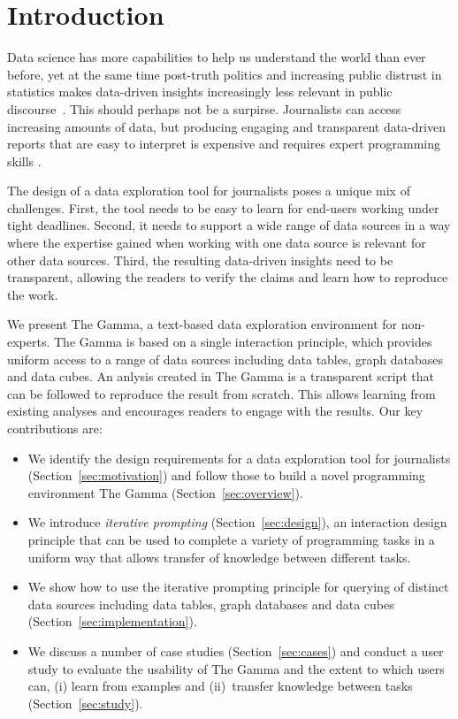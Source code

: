 \documentclass{sigchi}
\begin{document}
\section{Introduction}
Data science has more capabilities to help us understand the world than ever before, yet at the
same time post-truth politics and increasing public distrust in statistics makes data-driven insights
increasingly less relevant in public discourse~\cite{howstatslost}. This should perhaps not be a surpirse.
Journalists can access increasing amounts of data, but producing engaging and transparent data-driven
reports that are easy to interpret is expensive and requires expert programming skills \cite{ddj}.

The design of a data exploration tool for journalists poses a unique mix of challenges. First, the
tool needs to be easy to learn for end-users working under tight deadlines. Second, it needs to
support a wide range of data sources in a way where the expertise gained when working with one data
source is relevant for other data sources. Third, the resulting data-driven insights need to be
transparent, allowing the readers to verify the claims and learn how to reproduce the work.

We present The Gamma, a text-based data exploration environment for non-experts. The Gamma
is based on a single interaction principle, which provides uniform
access to a range of data sources including data tables, graph databases and data cubes.
An anlysis created in The Gamma is a transparent script that can be followed to reproduce the
result from scratch. This allows learning from existing analyses and encourages readers
to engage with the results. Our key contributions are:

\begin{itemize}
\item We identify the design requirements for a data exploration tool for journalists
  (Section~\ref{sec:motivation}) and follow those to build a novel programming environment
  The Gamma (Section~\ref{sec:overview}).

\item We introduce \emph{iterative prompting} (Section~\ref{sec:design}),
  an interaction design principle that can be used to complete a variety of programming
  tasks in a uniform way that allows transfer of knowledge between different tasks.

\item We show how to use the iterative prompting principle for querying of distinct data
  sources including data tables, graph databases and data cubes (Section~\ref{sec:implementation}).

\item We discuss a number of case studies (Section~\ref{sec:cases}) and
  conduct a user study to evaluate the usability of The Gamma and the extent to which users can,
  (i) learn from examples and (ii)~transfer knowledge between tasks (Section~\ref{sec:study}).
\end{itemize}
\end{document}
